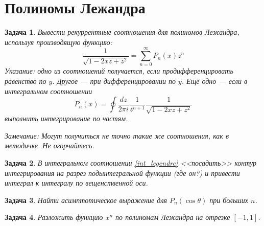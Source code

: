 \documentclass{article}
\newtheorem{problem}{Задача}
\begin{document}
\section{Полиномы Лежандра}
\begin{problem}
    Вывести рекуррентные соотношения для полиномов Лежандра, используя производящую
    функцию:
    \begin{equation}
        \frac{1}{\sqrt{1 - 2xz + z^2}} = \sum_{n = 0}^\infty P_n(x) z^n
    \end{equation}
    \emph{Указание:} одно из соотношений получается, если продифференцировать равенство
    по $y$. Другое --- при дифференцировании по $y$. Ещё одно --- если в интегральном 
    соотношении
    \begin{equation}
        \label{int_legendre}
        P_n(x) = \oint \frac{dz}{2\pi i} \frac{1}{z^{n+1}} \frac{1}{\sqrt{1 - 2xz + z^2}}
    \end{equation}
    выполнить интегрирование по частям.

    \emph{Замечание:} Могут получиться не точно такие же соотношения, как в методичке. 
    Не огорчайтесь.
\end{problem}
    
\begin{problem}
    В интегральном соотношении \eqref{int_legendre} <<посадить>> контур интегрирования
    на разрез подынтегральной функции (где он?) и привести интеграл к интегралу по 
    вещенственной оси.
\end{problem}

\begin{problem}
    Найти асимптотическое выражение для $P_n(\cos{\theta})$ при больших $n$. 
\end{problem}

\begin{problem}
    Разложить функцию $x^n$ по полиномам Лежандра на отрезке $[-1,1]$.
\end{problem}
\end{document}
